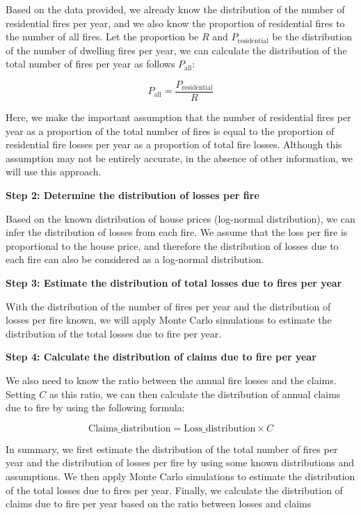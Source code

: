 \documentclass[12pt]{article}  %
\begin{document}
Based on the data provided, we already know the distribution of the number of residential fires per year, and we also know the proportion of residential fires to the number of all fires. Let the proportion be $R$ and $P_{\text{residential}}$ be the distribution of the number of dwelling fires per year, we can calculate the distribution of the total number of fires per year as follows $P_{\text{all}}$:

$$
P_{\text{all}} = \frac{P_{\text{residential}}}{R}
$$

Here, we make the important assumption that the number of residential fires per year as a proportion of the total number of fires is equal to the proportion of residential fire losses per year as a proportion of total fire losses. Although this assumption may not be entirely accurate, in the absence of other information, we will use this approach.

\textbf{Step 2: Determine the distribution of losses per fire}

Based on the known distribution of house prices (log-normal distribution), we can infer the distribution of losses from each fire. We assume that the loss per fire is proportional to the house price, and therefore the distribution of losses due to each fire can also be considered as a log-normal distribution.

\textbf{Step 3: Estimate the distribution of total losses due to fires per year}

With the distribution of the number of fires per year and the distribution of losses per fire known, we will apply Monte Carlo simulations\textsuperscript{\cite{MonteCarlo}} to estimate the distribution of the total losses due to fire per year.

\textbf{Step 4: Calculate the distribution of claims due to fire per year}

We also need to know the ratio between the annual fire losses and the claims. Setting $C$ as this ratio, we can then calculate the distribution of annual claims due to fire by using the following formula:

$$
\text{Claims\_distribution} = \text{Loss\_distribution} \times  C
$$

In summary, we first estimate the distribution of the total number of fires per year and the distribution of losses per fire by using some known distributions and assumptions. We then apply Monte Carlo simulations to estimate the distribution of the total losses due to fires per year. Finally, we calculate the distribution of claims due to fire per year based on the ratio between losses and claims
\end{document}
